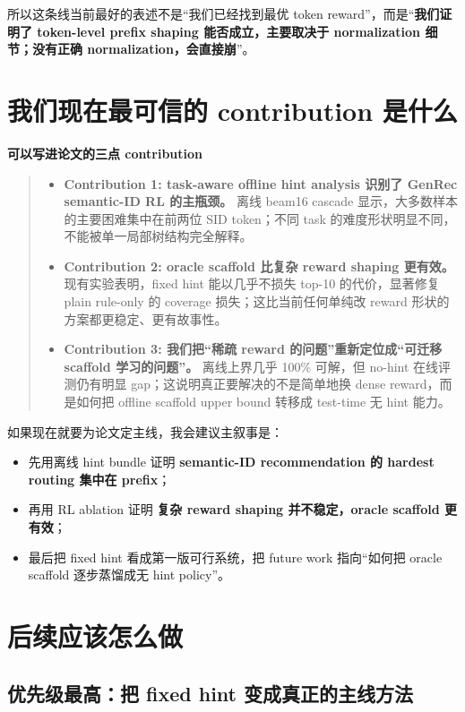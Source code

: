 \documentclass[a4paper]{article}
\newenvironment{findingbox}[1]{\par\medskip\noindent\textbf{#1}\par\begin{quote}\itshape}{\end{quote}\medskip}
\begin{document}
所以这条线当前最好的表述不是“我们已经找到最优 token reward”，而是“\textbf{我们证明了 token-level prefix shaping 能否成立，主要取决于 normalization 细节；没有正确 normalization，会直接崩}”。

\section{我们现在最可信的 contribution 是什么}

\begin{findingbox}{可以写进论文的三点 contribution}
\begin{itemize}
\item \textbf{Contribution 1: task-aware offline hint analysis 识别了 GenRec semantic-ID RL 的主瓶颈。} 离线 beam16 cascade 显示，大多数样本的主要困难集中在前两位 SID token；不同 task 的难度形状明显不同，不能被单一局部树结构完全解释。
\item \textbf{Contribution 2: oracle scaffold 比复杂 reward shaping 更有效。} 现有实验表明，fixed hint 能以几乎不损失 top-10 的代价，显著修复 plain rule-only 的 coverage 损失；这比当前任何单纯改 reward 形状的方案都更稳定、更有故事性。
\item \textbf{Contribution 3: 我们把“稀疏 reward 的问题”重新定位成“可迁移 scaffold 学习的问题”。} 离线上界几乎 100\% 可解，但 no-hint 在线评测仍有明显 gap；这说明真正要解决的不是简单地换 dense reward，而是如何把 offline scaffold upper bound 转移成 test-time 无 hint 能力。
\end{itemize}
\end{findingbox}

如果现在就要为论文定主线，我会建议主叙事是：
\begin{itemize}
\item 先用离线 hint bundle 证明 \textbf{semantic-ID recommendation 的 hardest routing 集中在 prefix}；
\item 再用 RL ablation 证明 \textbf{复杂 reward shaping 并不稳定，oracle scaffold 更有效}；
\item 最后把 fixed hint 看成第一版可行系统，把 future work 指向“如何把 oracle scaffold 逐步蒸馏成无 hint policy”。
\end{itemize}

\section{后续应该怎么做}

\subsection{优先级最高：把 fixed hint 变成真正的主线方法}
\end{document}
